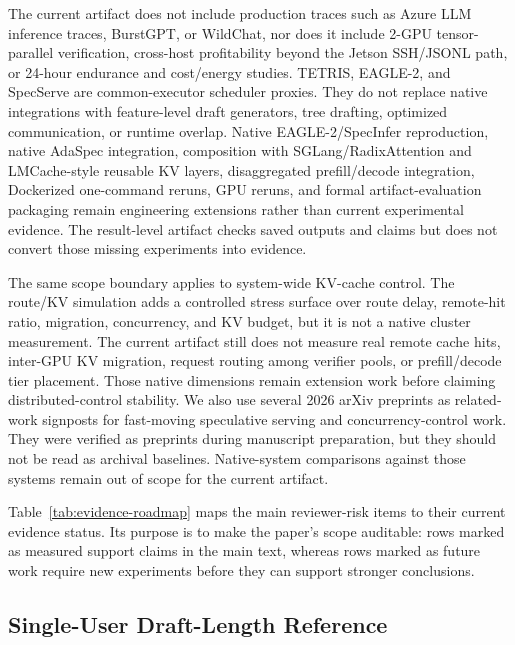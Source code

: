\documentclass[10pt,journal,onecolumn]{IEEEtran}
\begin{document}
The current artifact does not include production traces such as Azure
LLM inference traces, BurstGPT, or WildChat, nor does it include
2-GPU tensor-parallel verification, cross-host profitability beyond
the Jetson SSH/JSONL path, or 24-hour endurance and cost/energy
studies. TETRIS, EAGLE-2, and SpecServe are common-executor scheduler
proxies. They do not replace native integrations with feature-level
draft generators, tree drafting, optimized communication, or runtime
overlap. Native EAGLE-2/SpecInfer reproduction, native AdaSpec
integration, composition with SGLang/RadixAttention and LMCache-style
reusable KV layers, disaggregated prefill/decode integration,
Dockerized one-command reruns, GPU reruns, and formal
artifact-evaluation packaging remain engineering extensions rather
than current experimental evidence. The result-level artifact checks
saved outputs and claims but does not convert those missing
experiments into evidence.

The same scope boundary applies to system-wide KV-cache control. The
route/KV simulation adds a controlled stress surface over route delay,
remote-hit ratio, migration, concurrency, and KV budget, but it is not
a native cluster measurement. The current artifact still does not
measure real remote cache hits, inter-GPU KV migration, request
routing among verifier pools, or prefill/decode tier placement. Those
native dimensions remain extension work before claiming
distributed-control stability. We also use several 2026 arXiv
preprints as related-work signposts for fast-moving speculative
serving and concurrency-control work. They were verified as preprints
during manuscript preparation, but they should not be read as archival
baselines. Native-system comparisons against those systems remain out
of scope for the current artifact.

Table~\ref{tab:evidence-roadmap} maps the main reviewer-risk items to
their current evidence status. Its purpose is to make the paper's scope
auditable: rows marked as measured support claims in the main text,
whereas rows marked as future work require new experiments before they
can support stronger conclusions.

\subsection{Single-User Draft-Length Reference}
\label{app:single-user-opt}
\end{document}
